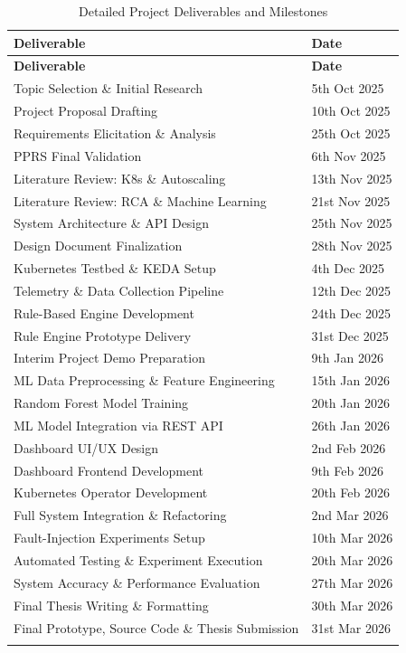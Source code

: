 \begin{xltabular}{\textwidth}{|X|p{3.5cm}|}

\hline
\textbf{Deliverable} & \textbf{Date} \\ \hline
\endfirsthead

\hline
\textbf{Deliverable} & \textbf{Date} \\ \hline
\endhead

Topic Selection \& Initial Research & 5th Oct 2025 \\ \hline
Project Proposal Drafting & 10th Oct 2025 \\ \hline
Requirements Elicitation \& Analysis & 25th Oct 2025 \\ \hline
PPRS Final Validation & 6th Nov 2025 \\ \hline
Literature Review: K8s \& Autoscaling & 13th Nov 2025 \\ \hline
Literature Review: RCA \& Machine Learning & 21st Nov 2025 \\ \hline
System Architecture \& API Design & 25th Nov 2025 \\ \hline
Design Document Finalization & 28th Nov 2025 \\ \hline
Kubernetes Testbed \& KEDA Setup & 4th Dec 2025 \\ \hline
Telemetry \& Data Collection Pipeline & 12th Dec 2025 \\ \hline
Rule-Based Engine Development & 24th Dec 2025 \\ \hline
Rule Engine Prototype Delivery & 31st Dec 2025 \\ \hline
Interim Project Demo Preparation & 9th Jan 2026 \\ \hline
ML Data Preprocessing \& Feature Engineering & 15th Jan 2026 \\ \hline
Random Forest Model Training & 20th Jan 2026 \\ \hline
ML Model Integration via REST API & 26th Jan 2026 \\ \hline
Dashboard UI/UX Design & 2nd Feb 2026 \\ \hline
Dashboard Frontend Development & 9th Feb 2026 \\ \hline
Kubernetes Operator Development & 20th Feb 2026 \\ \hline
Full System Integration \& Refactoring & 2nd Mar 2026 \\ \hline
Fault-Injection Experiments Setup & 10th Mar 2026 \\ \hline
Automated Testing \& Experiment Execution & 20th Mar 2026 \\ \hline
System Accuracy \& Performance Evaluation & 27th Mar 2026 \\ \hline
Final Thesis Writing \& Formatting & 30th Mar 2026 \\ \hline
Final Prototype, Source Code \& Thesis Submission & 31st Mar 2026 \\ \hline

\caption{Detailed Project Deliverables and Milestones}
\label{tab:deliverables_expanded}
\end{xltabular}

